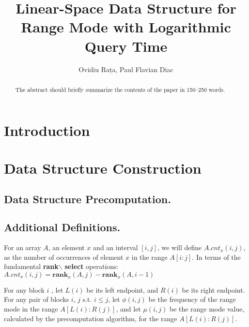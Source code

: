 \documentclass[runningheads]{llncs}
\begin{document}
%
\title{Linear-Space Data Structure for Range Mode with Logarithmic Query Time}
%
%
\author{Ovidiu Rața, Paul Flavian Diac}
%
%
%
\maketitle              %
%
\begin{abstract}
The abstract should briefly summarize the contents of the paper in
150--250 words.

\end{abstract}
%
%
%
\section{Introduction}


\section{Data Structure Construction}

\subsection*{Data Structure Precomputation.}

\subsection*{Additional Definitions.}
For an array $A$, an element $x$ and an interval $[i,j]$, we will define $A.cnt_x(i,j)$, 
as the number of occurrences of element $x$ in the range $A[i:j]$. 
In terms of the fundamental \textbf{rank}$\backslash$ \textbf{select} operations: $A.cnt_x(i,j)=\textbf{rank}_x(A,j)-\textbf{rank}_x(A,i-1)$

For any block $i$ , let $L(i)$ be its left endpoint, and $R(i)$ be its right endpoint.
For any pair of blocks $i$, $j$ s.t. $i\leq j$, let $\phi(i,j)$ be the frequency of the range mode in the range $A[L(i):R(j)]$, 
and let $\mu(i,j)$ be the range mode value, calculated by the precomputation algorithm, for the range $A[L(i):R(j)]$.
\end{document}
